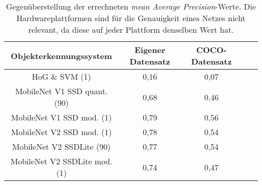 \begin{table}[H]
	\caption{Gegenüberstellung der errechneten \textit{mean Average Precision}-Werte. Die Hardwareplattformen sind für die Genauigkeit eines Netzes nicht relevant, da diese auf jeder Plattform denselben Wert hat.  }
	\begin{center}
		
		\begin{tabular}{|c|c|c|c|c|}
			\hline
			\multicolumn{1}{|c|}{Objekterkennungssystem} & \multicolumn{1}{c|}{Eigener Datensatz} & \multicolumn{1}{c|}{COCO-Datensatz} \\ \hline
			HoG \& SVM (1)	& 0,16	& 0,07		 \\
			MobileNet V1 SSD quant. (90)			&0,68	&0,46	 	 \\
			MobileNet V1 SSD mod. (1)		&0,79	&0,56	 \\
			MobileNet V2 SSD mod. (1)	&0,78 &0,54  \\
			MobileNet V2 SSDLite (90)			&0,77	& 0,54	 \\
			MobileNet V2 SSDLite mod. (1)			&0,74	&0,47	 \\
			
			\hline
		\end{tabular}
	\end{center}

	\label{fig: genauigkeiten}
\end{table}